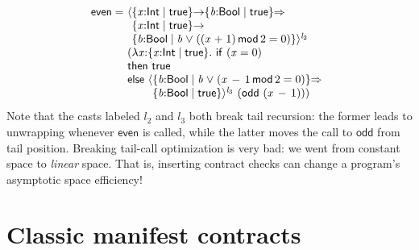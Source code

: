 \documentclass[9pt]{extarticle}
\newcommand{\ottnt}[1]{\mathit{#1}}
\newcommand{\ottsym}[1]{#1}
\begin{document}
{\[\begin{array}{@{}r@{~}l}
   \mathsf{even}  = &  \langle    \{ \mathit{x} \mathord{:}  \mathsf{Int}  \mathrel{\mid}  \mathsf{true}  \}  \mathord{ \rightarrow }  \{ \mathit{b} \mathord{:}  \mathsf{Bool}  \mathrel{\mid}  \mathsf{true}  \}    \mathord{ \overset{    }{\Rightarrow} }   {} \\  &  \phantom{\langle}   \{ \mathit{x} \mathord{:}  \mathsf{Int}  \mathrel{\mid}  \mathsf{true}  \}  \mathord{ \rightarrow } {} \\  &  \phantom{\langle}   \{ \mathit{b} \mathord{:}  \mathsf{Bool}  \mathrel{\mid}  \mathit{b}  \mathrel{\vee}   (   (  \mathit{x}  \mathrel{+}  \ottsym{1}  )  \,  \mathsf{mod}  \, \ottsym{2}  \mathrel{=}  \ottsym{0}  )   \}    \rangle^{ \ottnt{l_{{\mathrm{2}}}} } ~  {} \\  &   (  \lambda \mathit{x} \mathord{:}  \{ \mathit{x} \mathord{:}  \mathsf{Int}  \mathrel{\mid}  \mathsf{true}  \}  .~   \mathsf{if}~  (  \mathit{x}  \mathrel{=}  \ottsym{0}  )   \\ & \mathsf{then}~  \mathsf{true}   \\ & \mathsf{else}~  \langle   \{ \mathit{b} \mathord{:}  \mathsf{Bool}  \mathrel{\mid}  \mathit{b}  \mathrel{\vee}   (  \mathit{x} \,  -  \, \ottsym{1} \,  \mathsf{mod}  \, \ottsym{2}  \mathrel{=}  \ottsym{0}  )   \}   \mathord{ \overset{    }{\Rightarrow} }  {} \\  &  \phantom{\mathsf{else}~}  \phantom{\langle}   \{ \mathit{b} \mathord{:}  \mathsf{Bool}  \mathrel{\mid}  \mathsf{true}  \}   \rangle^{ \ottnt{l_{{\mathrm{3}}}} } ~   (   \mathsf{odd}  ~  ( \mathit{x} \,  -  \, \ottsym{1} )   )     )  
\end{array} \]
Note that the casts labeled $\ottnt{l_{{\mathrm{2}}}}$ and $\ottnt{l_{{\mathrm{3}}}}$ both break tail
recursion: the former leads to unwrapping whenever $ \mathsf{even} $ is
called, while the latter moves the call to $ \mathsf{odd} $ from tail
position.
Breaking tail-call optimization is very bad: we went from constant
space to \textit{linear} space. That is, inserting contract checks can
change a program's asymptotic space efficiency!

\fi}

\section{Classic manifest contracts}
\label{sec:classic}
\end{document}
